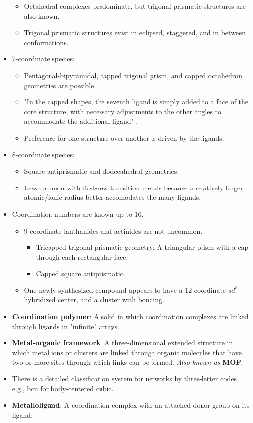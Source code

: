 \documentclass[../notes.tex]{subfiles}
\begin{document}
\begin{itemize}
\begin{itemize}
        \item Octahedral complexes predominate, but trigonal prismatic structures are also known.
        \item Trigonal prismatic structures exist in eclipsed, staggered, and in between conformations.
    \end{itemize}
    \item 7-coordinate species:
    \begin{itemize}
        \item Pentagonal-bipyramidal, capped trigonal prism, and capped octahedron geometries are possible.
        \item "In the capped shapes, the seventh ligand is simply added to a face of the core structure, with necessary adjustments to the other angles to accommodate the additional ligand" \parencite[343]{bib:MiesslerFischerTarr}.
        \item Preference for one structure over another is driven by the ligands.
    \end{itemize}
    \item 8-coordinate species:
    \begin{itemize}
        \item Square antiprismatic and dodecahedral geometries.
        \item Less common with first-row transition metals because a relatively larger atomic/ionic radius better accomodates the many ligands.
    \end{itemize}
    \item Coordination numbers are known up to 16.
    \begin{itemize}
        \item 9-coordinate lanthanides and actinides are not uncommon.
        \begin{itemize}
            \item Tricapped trigonal prismatic geometry: A triangular prism with a cap through each rectangular face.
            \item Capped square antiprismatic.
        \end{itemize}
        \item One newly synthesized compound appears to have a 12-coordinate $sd^5$-hybridized  center, and a cluster with  bonding.
    \end{itemize}
    \item \textbf{Coordination polymer}: A solid  in which coordination complexes are linked through ligands in "infinite" arrays.
    \item \textbf{Metal-organic framework}: A three-dimensional extended structure in which metal ions or clusters are linked through organic molecules that have two or more sites through which links can be formed. \emph{Also known as} \textbf{MOF}.
    \item There is a detailed classification system for networks by three-letter codes, e.g., bcu for body-centered cubic.
    \item \textbf{Metalloligand}: A coordination complex with an attached donor group on its ligand.
\end{itemize}
\end{document}
